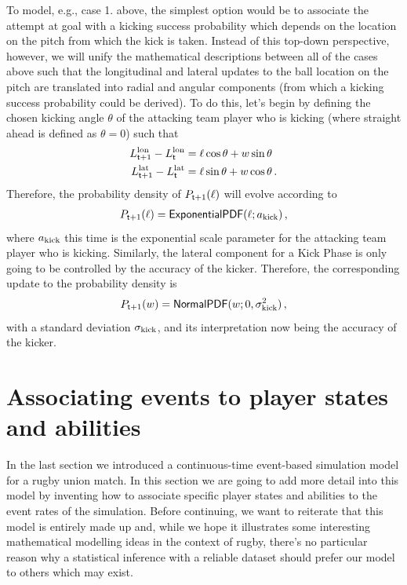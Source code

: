 To model, e.g., case 1. above, the simplest option would be to associate the attempt at goal with a kicking success probability which depends on the location on the pitch from which the kick is taken. Instead of this top-down perspective, however, we will unify the mathematical descriptions between all of the cases above such that the longitudinal and lateral updates to the ball location on the pitch are translated into radial and angular components (from which a kicking success probability could be derived). To do this, let's begin by defining the chosen kicking angle $\theta$ of the attacking team player who is kicking (where straight ahead is defined as $\theta = 0$) such that
\begin{align}
L^{\rm lon}_{{\sf t}+1}-L^{\rm lon}_{{\sf t}}&=\ell \cos \theta + w \sin \theta \\
L^{\rm lat}_{{\sf t}+1}-L^{\rm lat}_{{\sf t}}&=\ell \sin \theta + w \cos \theta \,.
\end{align} 
Therefore, the probability density of $P_{{\sf t}+1}(\ell )$ will evolve according to
\begin{align}
P_{{\sf t}+1}(\ell ) = {\sf ExponentialPDF}(\ell; a_{\rm kick}) \label{eq:longitudinal-motion-rugby-kicking} \,,
\end{align}
where $a_{\rm kick}$ this time is the exponential scale parameter for the attacking team player who is kicking. Similarly, the lateral component for a {\sf Kick Phase} is only going to be controlled by the accuracy of the kicker. Therefore, the corresponding update to the probability density is
\begin{align}
P_{{\sf t}+1}(w) = {\sf NormalPDF}(w;0, \sigma_{\rm kick}^2) \label{eq:lateral-motion-rugby-kicking} \,,
\end{align}
with a standard deviation $\sigma_{\rm kick}$, and its interpretation now being the accuracy of the kicker.

\section{\sffamily Associating events to player states and abilities}

In the last section we introduced a continuous-time event-based simulation model for a rugby union match. In this section we are going to add more detail into this model by inventing how to associate specific player states and abilities to the event rates of the simulation. Before continuing, we want to reiterate that this model is entirely made up and, while we hope it illustrates some interesting mathematical modelling ideas in the context of rugby, there's no particular reason why a statistical inference with a reliable dataset should prefer our model to others which may exist.

